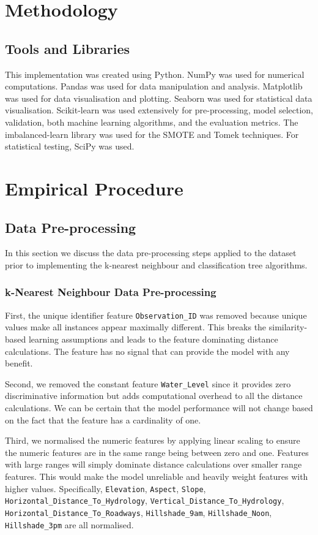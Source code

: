 \documentclass[conference]{IEEEtran}
\begin{document}
\section{Methodology}
\subsection{Tools and Libraries}
This implementation was created using Python. NumPy was used for numerical computations. Pandas was used for data manipulation and analysis. Matplotlib was used for data visualisation and plotting. Seaborn was used for statistical data visualisation. Scikit-learn was used extensively for pre-processing, model selection, validation, both machine learning algorithms, and the evaluation metrics. The imbalanced-learn library was used for the SMOTE and Tomek techniques. For statistical testing, SciPy was used.
\section{Empirical Procedure}

\subsection{Data Pre-processing}
In this section we discuss the data pre-processing steps applied to the dataset prior to implementing the k-nearest neighbour and classification tree algorithms.
\subsubsection{k-Nearest Neighbour Data Pre-processing}
First, the unique identifier feature \texttt{Observation\_ID} was removed because unique values make all instances appear maximally different. This breaks the similarity-based learning assumptions and leads to the feature dominating distance calculations. The feature has no signal that can provide the model with any benefit.

Second, we removed the constant feature \texttt{Water\_Level} since it provides zero discriminative information but adds computational overhead to all the distance calculations. We can be certain that the model performance will not change based on the fact that the feature has a cardinality of one.

Third, we normalised the numeric features by applying linear scaling to ensure the numeric features are in the same range being between zero and one. Features with large ranges will simply dominate distance calculations over smaller range features. This would make the model unreliable and heavily weight features with higher values. Specifically, \texttt{Elevation}, \texttt{Aspect}, \texttt{Slope}, \texttt{Horizontal\_Distance\_To\_Hydrology}, \texttt{Vertical\_Distance\_To\_Hydrology}, \texttt{Horizontal\_Distance\_To\_Roadways}, \texttt{Hillshade\_9am}, \texttt{Hillshade\_Noon}, \texttt{Hillshade\_3pm}
 are all normalised.
 
\end{document}
